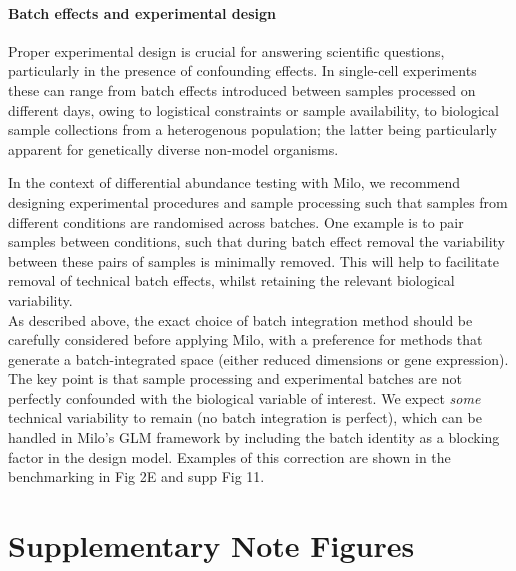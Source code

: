\documentclass[
]{article}
\begin{document}
\hypertarget{batch-effects-and-experimental-design}{%
\paragraph*{Batch effects and experimental design}\label{batch-effects-and-experimental-design}}

Proper experimental design is crucial for answering scientific questions, particularly in the presence of confounding effects. In single-cell experiments these
can range from batch effects introduced between samples processed on different days, owing to logistical constraints or sample availability, to biological sample
collections from a heterogenous population; the latter being particularly apparent for genetically diverse non-model organisms.

In the context of differential abundance testing with Milo, we recommend designing experimental procedures and sample processing such that samples from different
conditions are randomised across batches. One example is to pair samples between conditions, such that during batch effect removal the variability between these
pairs of samples is minimally removed. This will help to facilitate removal of technical batch effects, whilst retaining the relevant biological variability.\\
As described above, the exact choice of batch integration method should be carefully considered before applying Milo, with a preference for methods that generate
a batch-integrated space (either reduced dimensions or gene expression). The key point is that sample processing and experimental batches are not perfectly
confounded with the biological variable of interest. We expect \emph{some} technical variability to remain (no batch integration is perfect), which can be handled in
Milo's GLM framework by including the batch identity as a blocking factor in the design model. Examples of this correction are shown in the benchmarking in
Fig 2E and supp Fig 11.

\hypertarget{supplementary-note-figures}{%
\section{Supplementary Note Figures}\label{supplementary-note-figures}}

\renewcommand{\figurename}{Supplementary Note Figure}
\end{document}
